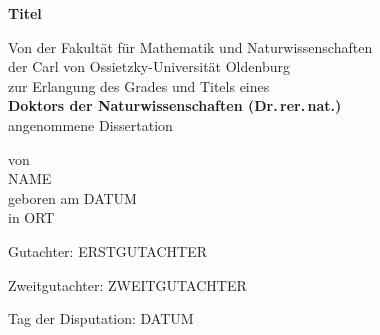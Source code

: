 \documentclass[10pt,a4paper]{letter}
\begin{document}
\thispagestyle{empty}
\vspace*{.5cm}
\begin{center}
\begin{Large}
\begin{onehalfspace}
\textbf{Titel}
\end{onehalfspace}
\end{Large}
\vspace*{3cm}

Von der Fakultät für Mathematik und Naturwissenschaften\\
der Carl von Ossietzky-Universität Oldenburg\\
zur Erlangung des Grades und Titels eines\\
\textbf{Doktors der Naturwissenschaften (Dr.\,rer.\,nat.)}\\
angenommene Dissertation\\
\vspace*{2cm}

von\\
NAME\\
geboren am DATUM\\
in ORT
\end{center}

\newpage
\thispagestyle{empty}
\vspace*{10cm}

\noindent Gutachter: ERSTGUTACHTER
\vspace*{.5cm}

\noindent Zweitgutachter: ZWEITGUTACHTER
\vspace*{.5cm}

\noindent Tag der Disputation: DATUM
\vspace*{.5cm}
\hfill
\end{document}

